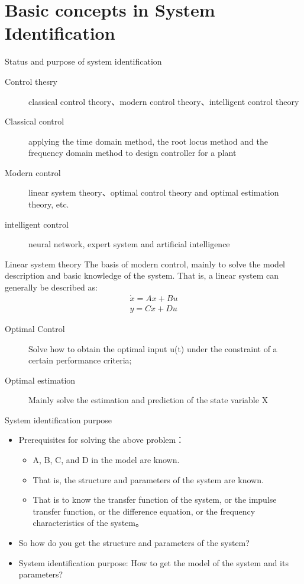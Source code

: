 \section{Basic concepts in System Identification}
\begin{frame}{Status and purpose of system identification}
\begin{description}
\item[Control thesry]classical control theory、modern control theory、intelligent control theory
\item[Classical control]applying the time domain method, the root locus method and the frequency domain method to design controller for a plant
\item[Modern control] linear system theory、optimal control theory and optimal estimation theory, etc.
\item[intelligent control]neural network, expert system and artificial intelligence
\end{description}
\end{frame}

\begin{frame}{Linear system theory}
The basis of modern control, mainly to solve the model description and basic knowledge of the system. That is, a linear system can generally be described as:
\begin{eqnarray}
\dot x = Ax+Bu \\
y=Cx+Du
\end{eqnarray}
\begin{description}
\item[Optimal Control] Solve how to obtain the optimal input u(t) under the constraint of a certain performance criteria;
\item[Optimal estimation] Mainly solve the estimation and prediction of the state variable X
\end{description}
\end{frame}


\begin{frame}{System identification purpose}
\begin{itemize}
\item Prerequisites for solving the above problem：
\begin{itemize}
\item A, B, C, and D in the model are known.
\item That is, the structure and parameters of the system are known.
\item That is to know the transfer function of the system, or the impulse transfer function, or the difference equation, or the frequency characteristics of the system。
\end{itemize}
\item So how do you get the structure and parameters of the system?
\item System identification purpose: How to get the model of the system and its parameters?
\end{itemize}
\end{frame}

